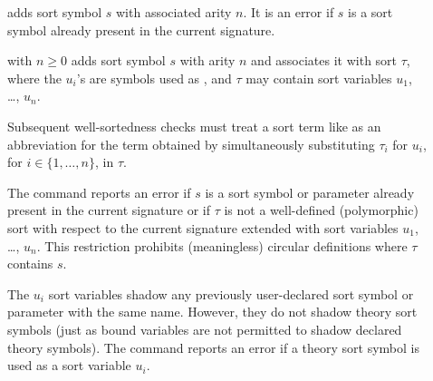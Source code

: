 \begin{description}

%
\item[]
\smallskip

%
\item[]
adds sort symbol $s$ with associated arity $n$.
It is an error if $s$ is a sort symbol  already present 
in the current signature.
\smallskip

%
\item[] with $n \geq 0$
adds sort symbol $s$ with arity $n$ and associates it with sort $\tau$,
where the $u_i$'s are symbols used as , and $\tau$ may contain sort
variables $u_1$, \dots, $u_n$.


Subsequent well-sortedness checks must treat a sort term like
as an abbreviation for the term obtained by simultaneously substituting
$\tau_i$ for $u_i$, for $i\in\{1,\ldots,n\}$, in $\tau$.

The command reports an error
if $s$ is a sort symbol or parameter already present in the current signature or
if $\tau$ is not a well-defined (polymorphic) sort 
with respect to the current signature extended with sort variables 
$u_1$, \dots, $u_n$.
This restriction prohibits (meaningless) circular definitions
where $\tau$ contains $s$.
\begin{newver}
The $u_i$ sort variables shadow any previously user-declared sort symbol
or parameter with the same name.
However, they do not shadow theory sort symbols (just as bound variables are
not permitted to shadow declared theory symbols).  The command reports an error if a theory sort
symbol is used as a sort variable $u_i$.
\end{newver}


\end{description}
